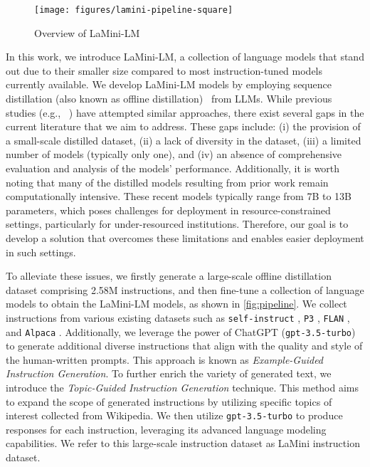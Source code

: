 \documentclass[11pt]{article}
\newcommand{\dataset}[1]{\texttt{#1}\xspace}
\newcommand{\modelname}{LaMini\xspace}
\newcommand{\modelnamefull}{LaMini-LM\xspace}
\newcommand{\llm}[1]{\texttt{#1}\xspace}
\newcommand{\chatgpt}{\llm{gpt-3.5-turbo}}
\begin{document}
\begin{figure}
    \centering
    \texttt{[image: figures/lamini-pipeline-square]}
    \caption{Overview of \modelnamefull}
    \label{fig:pipeline}
\end{figure} 
In this work, we introduce \modelnamefull, a collection of language models that stand out due to their smaller size compared to most instruction-tuned models currently available. We develop \modelnamefull models by employing sequence distillation (also known as offline distillation)~\cite{kim-rush-2016-sequence} from LLMs. 
While previous studies (e.g., ~\cite{alpaca, vicuna2023, gpt4all}) have attempted similar approaches, there exist several gaps in the current literature that we aim to address.  
These gaps include: (i) the provision of a small-scale distilled dataset, (ii) a lack of diversity in the dataset, (iii) a limited number of models (typically only one), and (iv) an absence of comprehensive evaluation and analysis of the models' performance.
Additionally, it is worth noting that many of the distilled models resulting from prior work remain computationally intensive. These recent models typically range from 7B to 13B parameters, which poses challenges for deployment in resource-constrained settings, particularly for under-resourced institutions. Therefore, our goal is to develop a solution that overcomes these limitations and enables easier deployment in such settings.

To alleviate these issues, we firstly generate a large-scale offline distillation dataset comprising 2.58M instructions, and then fine-tune a collection of language models to obtain the \modelnamefull models, as shown in \autoref{fig:pipeline}. We collect instructions from various existing datasets such as \dataset{self-instruct} \cite{DBLP:journals/corr/abs-2212-10560}, \dataset{P3} \cite{DBLP:conf/iclr/SanhWRBSACSRDBX22}, \dataset{FLAN} \cite{DBLP:journals/corr/abs-2301-13688}, and \dataset{Alpaca} \cite{alpaca}. Additionally, we leverage the power of ChatGPT (\chatgpt) to generate additional diverse instructions that align with the quality and style of the human-written prompts. This approach is known as \textit{Example-Guided Instruction Generation}. To further enrich the variety of generated text, we introduce the \textit{Topic-Guided Instruction Generation} technique. This method aims to expand the scope of generated instructions by utilizing specific topics of interest collected from Wikipedia. We then utilize \chatgpt to produce responses for each instruction, leveraging its advanced language modeling capabilities. We refer to this large-scale instruction dataset as \modelname instruction dataset.
\end{document}
